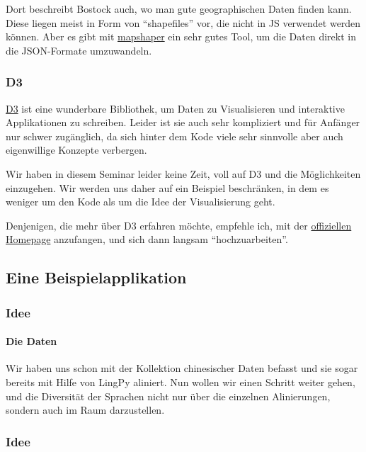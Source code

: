 Dort beschreibt Bostock auch, wo man gute geographischen Daten finden
kann. Diese liegen meist in Form von ``shapefiles'' vor, die nicht in JS
verwendet werden können. Aber es gibt mit
\href{http://mapshaper.org/}{mapshaper} ein sehr gutes Tool, um die
Daten direkt in die JSON-Formate umzuwandeln.


\subsubsection{\texorpdfstring{{D3}}{D3}}

\href{http://d3js.org}{D3} ist eine wunderbare Bibliothek, um Daten zu
Visualisieren und interaktive Applikationen zu schreiben. Leider ist sie
auch sehr kompliziert und für Anfänger nur schwer zugänglich, da sich
hinter dem Kode viele sehr sinnvolle aber auch eigenwillige Konzepte
verbergen.

Wir haben in diesem Seminar leider keine Zeit, voll auf D3 und die
Möglichkeiten einzugehen. Wir werden uns daher auf ein Beispiel
beschränken, in dem es weniger um den Kode als um die Idee der
Visualisierung geht.

Denjenigen, die mehr über D3 erfahren möchte, empfehle ich, mit der
\href{http://d3js.org}{offiziellen Homepage} anzufangen, und sich dann
langsam ``hochzuarbeiten''.

\subsection{\texorpdfstring{{Eine
Beispielapplikation}}{Eine Beispielapplikation}}

\subsubsection{\texorpdfstring{{Idee}}{Idee}}

\paragraph{Die Daten}

Wir haben uns schon mit der Kollektion chinesischer Daten befasst und
sie sogar bereits mit Hilfe von LingPy aliniert. Nun wollen wir einen
Schritt weiter gehen, und die Diversität der Sprachen nicht nur über die
einzelnen Alinierungen, sondern auch im Raum darzustellen.


\subsubsection{\texorpdfstring{{Idee}}{Idee}}

